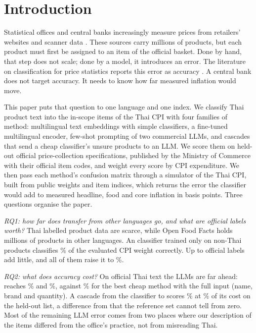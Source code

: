 \section{Introduction}\label{sec:introduction}

Statistical offices and central banks increasingly measure prices from retailers' websites
and scanner data \citep{cavallo2016bpp, eurostat2017scanner, eurostat2020webscraping}. These
sources carry millions of products, but each product must first be assigned to an item of
the official basket. Done by hand, that step does not scale;
done by a model, it introduces an error. The literature on classification for price
statistics reports this error as accuracy \citep{martindale2020semi, harms2019cbs,
bis2026spectrum}. A central bank does not target accuracy. It needs to know how far measured
inflation would move.

This paper puts that question to one language and one index. We classify Thai product text
into the in-scope items of the Thai CPI with four families of method: multilingual text
embeddings with simple classifiers, a fine-tuned multilingual encoder, few-shot prompting of
two commercial LLMs, and cascades that send a cheap classifier's unsure products to an LLM.
We score them on \NRefSpecs{} held-out official price-collection specifications, published
by the Ministry of Commerce with their official item codes, and weight every score by CPI
expenditure. We then pass each method's confusion matrix through a simulator of the Thai CPI,
built from public weights and item indices, which returns the error the classifier would add
to measured headline, food and core inflation in basis points. Three questions organise the
paper.

\emph{RQ1: how far does transfer from other languages go, and what are official labels
worth?} Thai labelled product data are scarce, while Open Food Facts holds millions of
products in other languages. An \NameEfive{} classifier trained only on non-Thai products
classifies \AccWEfiveMLPZeroShot\% of the evaluated CPI weight correctly. Up to
\CfgBudgetMax{} official labels add little, and all \NMocTrainval{} of them raise it to
\AccWEfiveMLP\%.

\emph{RQ2: what does accuracy cost?} On official Thai text the LLMs are far ahead:
\NameOpus{} reaches \AccWOpus\% and \NameHaiku{} \AccWHaiku\%, against \AccWXlmrFT\% for the
best cheap method with the full input (name, brand and quantity). A cascade from the \NameEfive{} classifier to \NameOpus{} scores
\AccWCasEfiveMLPOpus\% at \CostPctCasEfiveMLPOpus\% of its cost on the held-out list, a difference
from \NameOpus{} that the reference set cannot tell from zero. Most of the remaining LLM error comes from
two places where our description of the items differed from the office's practice, not from
misreading Thai.

